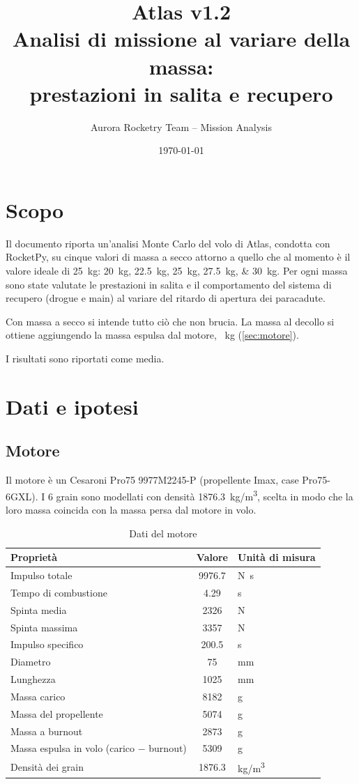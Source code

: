\documentclass[11pt,a4paper]{article}
\title{\textbf{Atlas v1.2}\\[2pt] \large Analisi di missione al variare della massa:\\ prestazioni in salita e recupero}
\author{Aurora Rocketry Team -- Mission Analysis}
\date{\today}
\begin{document}
\maketitle

\section*{Scopo}
Il documento riporta un'analisi Monte Carlo del volo di Atlas, condotta con RocketPy, su cinque valori di
massa a secco attorno a quello che al momento è il valore ideale di \SI{25}{kg}:
\SIlist{20;22.5;25;27.5;30}{kg}. Per ogni massa sono state valutate le prestazioni in salita e il comportamento
del sistema di recupero (drogue e main) al variare del ritardo di apertura dei paracadute.

Con massa a secco si intende tutto ciò che non brucia. La massa al decollo si ottiene aggiungendo la massa espulsa dal motore,
\PropellantMass~kg (\autoref{sec:motore}).

I risultati sono riportati come media.

\section{Dati e ipotesi}

\subsection{Motore}\label{sec:motore}
Il motore è un Cesaroni Pro75 9977M2245-P (propellente Imax, case Pro75-6GXL). I 6 grain sono modellati con densità \SI{1876.3}{kg/m^3}, scelta in modo che la loro
massa coincida con la massa persa dal motore in volo.

\begin{table}[htbp]
  \centering
  \caption{Dati del motore}
  \label{tab:motore}
  \begin{tabular}{lcl}
    \toprule
    Proprietà & Valore & Unità di misura \\
    \midrule
    Impulso totale & \num{9976.7} & \si{N.s} \\
    Tempo di combustione & \num{4.29} & \si{s} \\
    Spinta media & \num{2326} & \si{N} \\
    Spinta massima & \num{3357} & \si{N} \\
    Impulso specifico & \num{200.5} & \si{s} \\
    Diametro & \num{75} & \si{mm} \\
    Lunghezza & \num{1025} & \si{mm} \\
    Massa carico & \num{8182} & \si{g} \\
    Massa del propellente & \num{5074} & \si{g} \\
    Massa a burnout & \num{2873} & \si{g} \\
    Massa espulsa in volo (carico $-$ burnout) & \num{5309} & \si{g} \\
    Densità dei grain & \num{1876.3} & \si{kg/m^3} \\
    \bottomrule
  \end{tabular}
\end{table}
\newpage
\end{document}
